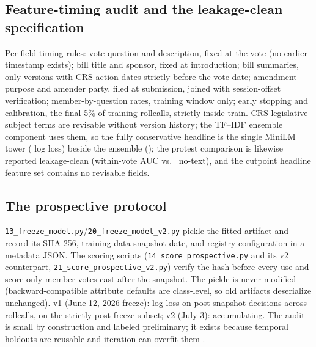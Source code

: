 \documentclass[11pt]{article}
\newcommand{\code}[1]{\texttt{#1}}
\begin{document}
\subsection{Feature-timing audit and the leakage-clean specification}
\label{sec:leakage}

Per-field timing rules: vote question and description, fixed at the vote
(no earlier timestamp exists); bill title and sponsor, fixed at
introduction; bill summaries, only versions with CRS action dates
strictly before the vote date; amendment purpose and amender party,
filed at submission, joined with session-offset verification;
member-by-question rates, training window only; early stopping and
calibration, the final 5\% of training rollcalls, strictly inside train.
CRS legislative-subject terms are revisable without version history; the
TF--IDF ensemble component uses them, so the fully conservative headline
is the single MiniLM tower (\incForecastLL{} log loss) beside the
ensemble (\champForecastLL); the protest comparison is likewise reported
leakage-clean (within-vote AUC \protAUCclean{} vs.\ \protAUCnotext{}
no-text), and the cutpoint headline feature set contains no revisable
fields.

\subsection{The prospective protocol}
\label{sec:prospective}

\code{13\_freeze\_model.py}/\code{20\_freeze\_model\_v2.py} pickle the
fitted artifact and record its SHA-256, training-data snapshot date, and
registry configuration in a metadata JSON. The scoring scripts
(\code{14\_score\_prospective.py} and its v2 counterpart,
\code{21\_score\_prospective\_v2.py}) verify the hash before every use
and score only member-votes cast after the snapshot. The pickle is never
modified (backward-compatible attribute defaults are class-level, so old
artifacts deserialize unchanged). v1 (June 12, 2026 freeze):
\prospectiveVoneLL{} log loss on \prospectiveN{} post-snapshot decisions
across \prospectiveRC{} rollcalls, \postFreezeLL{} on the strictly
post-freeze subset; v2 (July 3): accumulating. The audit is small by
construction and labeled preliminary; it exists because temporal
holdouts are reusable and iteration can overfit them
\citep{dwork2015holdout}.

\begin{table}[tbp]
\centering
\caption{Frozen-artifact scoring.}
\label{tab:prospective}

\end{table}
\end{document}

